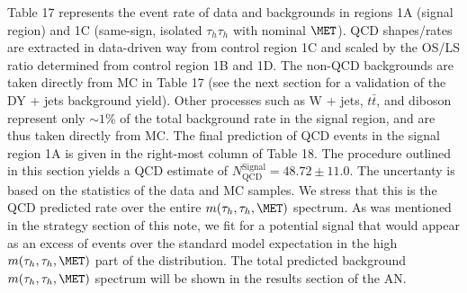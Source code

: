          
Table 17 represents the event rate of data and backgrounds in regions 1A (signal region) and 1C (same-sign, isolated $\tau_{h}\tau_{h}$ with nominal $\MET$). QCD 
shapes/rates are extracted in data-driven way from control region 1C and scaled by the OS/LS ratio determined from control region 1B and 1D. The non-QCD 
backgrounds are taken directly from MC in Table 17 (see the next section for a validation of the DY + jets background yield). Other processes such as W + jets, 
$t\bar{t}$, and diboson represent only $\sim 1$\% of the total background 
rate in the signal region, and are thus taken directly from MC. The final prediction of QCD events in the signal region 1A is given in the right-most column of 
Table 18. The procedure outlined in this section yields a QCD estimate of $N_{\textrm{QCD}}^{\textrm{Signal}} = 48.72 \pm 11.0$. The uncertanty is based on the 
statistics of the data and MC samples. We stress that this is the QCD predicted rate over the entire $m(\tau_{h},\tau_{h},\MET)$ spectrum. As was mentioned
in the strategy section of this note, we fit for a potential signal that would appear as an excess of events over the standard model expectation in the high 
$m(\tau_{h},\tau_{h},\MET)$ part of the distribution. The total predicted background $m(\tau_{h},\tau_{h},\MET)$ spectrum will be shown in the results section of 
the AN. 

\begin{table}[ht]
  \caption{Background and data yields in QCD control regions $A$ and $C$ under nominal isolation and $\MET$ conditions (i.e. isolated $+$ $\MET > 30$ GeV).}
  \label{table:CR3table}
\end{table}


